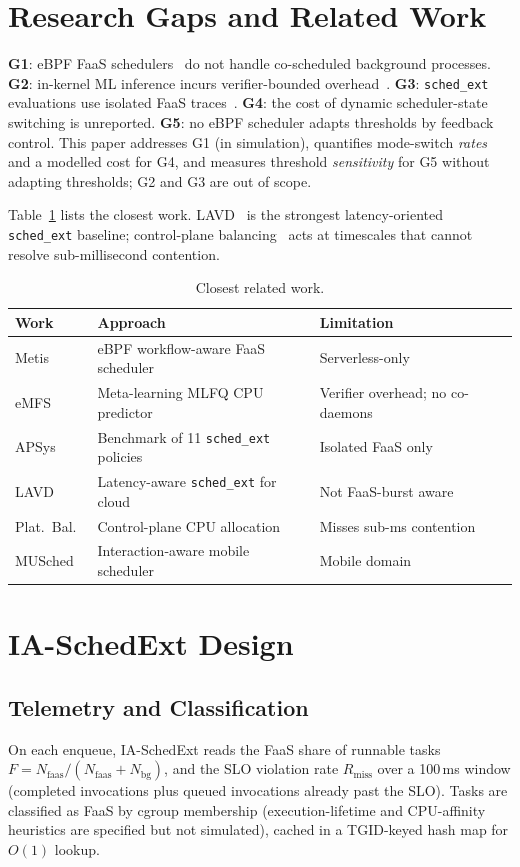 \documentclass[journal]{IEEEtran}
\begin{document}
\section{Research Gaps and Related Work}
\textbf{G1}: eBPF FaaS schedulers~\cite{metis,emfs} do not handle co-scheduled background processes. \textbf{G2}: in-kernel ML inference incurs verifier-bounded overhead~\cite{emfs}. \textbf{G3}: \texttt{sched\_ext} evaluations use isolated FaaS traces~\cite{apsys}. \textbf{G4}: the cost of dynamic scheduler-state switching is unreported. \textbf{G5}: no eBPF scheduler adapts thresholds by feedback control. This paper addresses G1 (in simulation), quantifies mode-switch \emph{rates} and a modelled cost for G4, and measures threshold \emph{sensitivity} for G5 without adapting thresholds; G2 and G3 are out of scope.

Table~\ref{tab:rel} lists the closest work. LAVD~\cite{lavd} is the strongest latency-oriented \texttt{sched\_ext} baseline; control-plane balancing~\cite{platbal} acts at timescales that cannot resolve sub-millisecond contention.

\begin{table}[t]
\centering\footnotesize
\caption{Closest related work.}\label{tab:rel}
\begin{tabular}{@{}p{}p{}p{}@{}}
\toprule
Work & Approach & Limitation\\\midrule
Metis~\cite{metis} & eBPF workflow-aware FaaS scheduler & Serverless-only\\
eMFS~\cite{emfs} & Meta-learning MLFQ CPU predictor & Verifier overhead; no co-daemons\\
APSys~\cite{apsys} & Benchmark of 11 \texttt{sched\_ext} policies & Isolated FaaS only\\
LAVD~\cite{lavd} & Latency-aware \texttt{sched\_ext} for cloud & Not FaaS-burst aware\\
Plat.\ Bal.~\cite{platbal} & Control-plane CPU allocation & Misses sub-ms contention\\
MUSched~\cite{musched} & Interaction-aware mobile scheduler & Mobile domain\\
\bottomrule
\end{tabular}
\end{table}

\section{IA-SchedExt Design}
\subsection{Telemetry and Classification}
On each enqueue, IA-SchedExt reads the FaaS share of runnable tasks $F=N_{\mathrm{faas}}/(N_{\mathrm{faas}}+N_{\mathrm{bg}})$, and the SLO violation rate $R_{\mathrm{miss}}$ over a 100\,ms window (completed invocations plus queued invocations already past the SLO). Tasks are classified as FaaS by cgroup membership (execution-lifetime and CPU-affinity heuristics are specified but not simulated), cached in a TGID-keyed hash map for $O(1)$ lookup.
\end{document}
